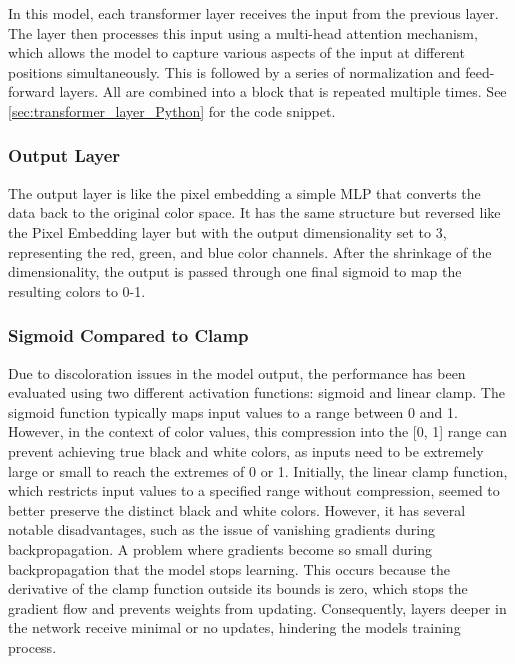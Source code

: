     In this model, each transformer layer receives the input from the previous layer. The layer then processes this input using a multi-head attention mechanism, which allows the model to capture various aspects of the input at different positions simultaneously. This is followed by a series of normalization and feed-forward layers. All are combined into a block that is repeated multiple times. See \autoref{sec:transformer_layer_Python} for the code snippet.


    \subsubsection{Output Layer}

    The output layer is like the pixel embedding a simple MLP that converts the data back to the original color space. It has the same structure but reversed like the Pixel Embedding layer but with the output dimensionality set to \(3\), representing the red, green, and blue color channels. After the shrinkage of the dimensionality, the output is passed through one final sigmoid to map the resulting colors to 0-1.

    \subsubsection{Sigmoid Compared to Clamp}
    \label{sec:sigmoid_vs_clamp}
    
    Due to discoloration issues in the model output, the performance has been evaluated using two different activation functions: sigmoid and linear clamp. The sigmoid function typically maps input values to a range between 0 and 1. However, in the context of color values, this compression into the [0, 1] range can prevent achieving true black and white colors, as inputs need to be extremely large or small to reach the extremes of 0 or 1. Initially, the linear clamp function, which restricts input values to a specified range without compression, seemed to better preserve the distinct black and white colors. However, it has several notable disadvantages, such as the issue of vanishing gradients during backpropagation. A problem where gradients become so small during backpropagation that the model stops learning. This occurs because the derivative of the clamp function outside its bounds is zero, which stops the gradient flow and prevents weights from updating. Consequently, layers deeper in the network receive minimal or no updates, hindering the models training process.
    
